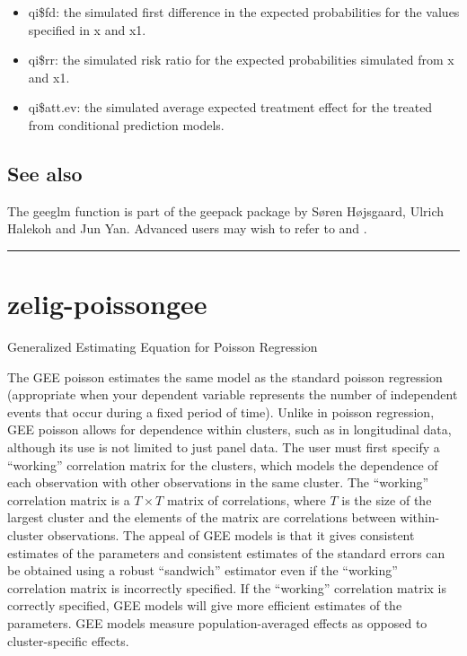 \documentclass[letterpaper,10pt,english]{sphinxmanual}
\begin{document}
\begin{itemize}
\begin{itemize}
\item {} 
qi\$fd: the simulated first difference in the expected
probabilities for the values specified in x and x1.

\item {} 
qi\$rr: the simulated risk ratio for the expected probabilities
simulated from x and x1.

\item {} 
qi\$att.ev: the simulated average expected treatment effect for the
treated from conditional prediction models.

\end{itemize}

\end{itemize}


\subsection{See also}
\label{vignette:id140}
The geeglm function is part of the geepack package by Søren Højsgaard,
Ulrich Halekoh and Jun Yan. Advanced users may wish to refer
to  and .


\bigskip\hrule{}\bigskip



\section{zelig-poissongee}
\label{vignette:zelig-poissongee}\label{vignette:zpoissongee}
Generalized Estimating Equation for Poisson Regression

The GEE poisson estimates the same model as the standard poisson
regression (appropriate when your dependent variable represents the
number of independent events that occur during a fixed period of time).
Unlike in poisson regression, GEE poisson allows for dependence within
clusters, such as in longitudinal data, although its use is not limited
to just panel data. The user must first specify a “working” correlation
matrix for the clusters, which models the dependence of each observation
with other observations in the same cluster. The “working” correlation
matrix is a \(T \times T\) matrix of correlations, where \(T\)
is the size of the largest cluster and the elements of the matrix are
correlations between within-cluster observations. The appeal of GEE
models is that it gives consistent estimates of the parameters and
consistent estimates of the standard errors can be obtained using a
robust “sandwich” estimator even if the “working” correlation matrix is
incorrectly specified. If the “working” correlation matrix is correctly
specified, GEE models will give more efficient estimates of the
parameters. GEE models measure population-averaged effects as opposed to
cluster-specific effects.
\end{document}
